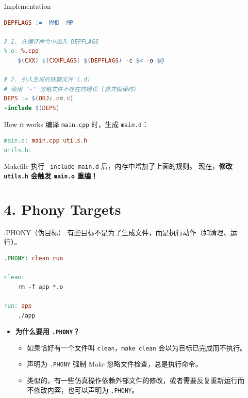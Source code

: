 \documentclass[aspectratio=169,10pt]{beamer}
\begin{document}
\begin{frame}[fragile,shrink=12]{Implementation}
\footnotesize
\begin{lstlisting}[language=make]
DEPFLAGS := -MMD -MP

# 1. 在编译命令中加入 DEPFLAGS
%.o: %.cpp
    $(CXX) $(CXXFLAGS) $(DEPFLAGS) -c $< -o $@

# 2. 引入生成的依赖文件 (.d)
# 使用 "-" 忽略文件不存在的错误 (首次编译时)
DEPS := $(OBJ:.o=.d)
-include $(DEPS)
\end{lstlisting}
\end{frame}

\begin{frame}[fragile,shrink=12]{How it works}
\footnotesize
编译 \texttt{main.cpp} 时，生成 \texttt{main.d}：

\begin{lstlisting}[language=make]
main.o: main.cpp utils.h
utils.h:
\end{lstlisting}

Makefile 执行 \texttt{-include\ main.d} 后，内存中增加了上面的规则。 现在，\textbf{修改 \texttt{utils.h} 会触发 \texttt{main.o} 重编！}
\end{frame}

\section{4. Phony Targets}

\begin{frame}[fragile,shrink=12]{.PHONY（伪目标）}
\footnotesize
有些目标不是为了生成文件，而是执行动作（如清理、运行）。

\begin{lstlisting}[language=make]
.PHONY: clean run

clean:
    rm -f app *.o

run: app
    ./app
\end{lstlisting}

\begin{itemize}
\item
  \textbf{为什么要用 \texttt{.PHONY}？}

  \begin{itemize}
  \item
    如果恰好有一个文件叫 \texttt{clean}，\texttt{make\ clean} 会以为目标已完成而不执行。
  \item
    声明为 \texttt{.PHONY} 强制 Make 忽略文件检查，总是执行命令。
  \item
    类似的，有一些仿真操作依赖外部文件的修改，或者需要反复重新运行而不修改内容，也可以声明为 \texttt{.PHONY}。
  \end{itemize}
\end{itemize}
\end{frame}
\end{document}
